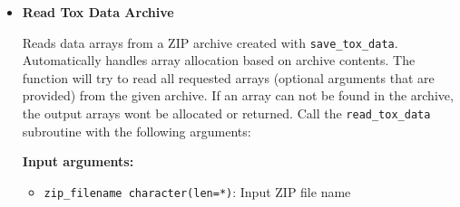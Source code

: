 \begin{enumerate}
\begin{itemize}
\begin{lstlisting}[language=Fortran, caption={Save Complete Data Archive}]
! Save all available data arrays
call save_tox_data("complete_data.zip", ierr, &
                  gene_ids=gene_ids, &
                  gene_ids_file="genes.bin", &
                  expression=expr_data, &
                  expression_file="expression.bin", &
                  gene_to_family=gene_to_fam, &
                  gene_to_family_file="mapping.bin", &
                  family_ids=family_ids, &
                  family_ids_file="families.bin", &
                  family_centroids=centroids, &
                  family_centroids_file="centroids.bin", &
                  shift_vectors=shift_vecs, &
                  shift_vectors_file="shifts.bin")
                  \end{lstlisting}
                  
                  \begin{lstlisting}[language=Fortran, caption={Save Partial Data Archive}]
! Save only gene IDs and expression data
call save_tox_data("expression_only.zip", ierr, &
                  gene_ids=gene_ids, &
                  gene_ids_file="genes.bin", &
                  expression=expr_data, &
                  expression_file="expression.bin")

! Save only family-related data
call save_tox_data("families_only.zip", ierr, &
                  family_ids=family_ids, &
                  family_ids_file="families.bin", &
                  family_centroids=centroids, &
                  family_centroids_file="centroids.bin")
                  \end{lstlisting}
                  
            \item \textbf{Read Tox Data Archive}
                  
                  Reads data arrays from a ZIP archive created with \texttt{save\_tox\_data}.
                  Automatically handles array allocation based on archive contents. The
                  function will try to read all requested arrays (optional arguments that
                  are provided) from the given archive. If an array can not be found in the
                  archive, the output arrays wont be allocated or returned. Call the \texttt{read\_tox\_data}
                  subroutine with the following arguments:
                  
                  \textbf{Input arguments:}
                  \begin{itemize}
                    \item \texttt{zip\_filename character(len=*)}: Input ZIP file name
                          

\end{itemize}
\end{itemize}
\end{enumerate}
